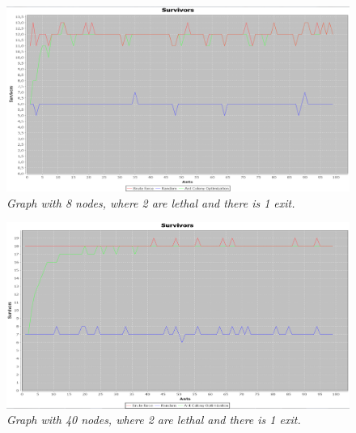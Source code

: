 \begin{figure} %
\hspace*{-1.5 cm}
\includegraphics[width=160mm]{images/8Nodes2Leathal1Exit.png}
\caption{\textit{Graph with 8 nodes, where 2 are lethal and there is 1 exit.}}
\label{fig:Rsmallgraph}
\end{figure}


\begin{figure} %
\hspace*{-1.5 cm}
\includegraphics[width=160mm]{images/40Nodes2Leathal2Exit.png}
\caption{\textit{Graph with 40 nodes, where 2 are lethal and there is 1 exit.}}
\label{fig:Rbiggraph}
\end{figure}

